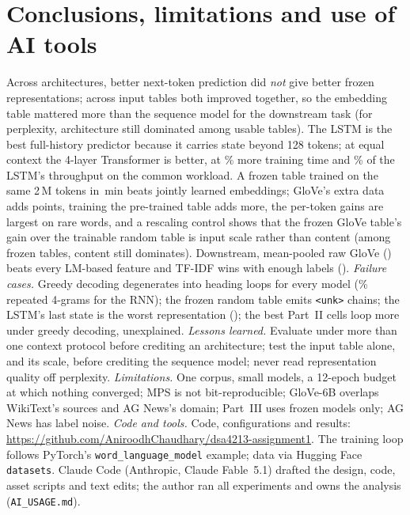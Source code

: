 \documentclass[10pt,a4paper]{article}
\begin{document}
\section{Conclusions, limitations and use of AI tools}
Across architectures, better next-token prediction did \emph{not} give better frozen representations; across input tables both improved together, so the embedding table mattered more than the sequence model for the downstream task (for perplexity, architecture still dominated among usable tables). The LSTM is the best
full-history predictor because it carries state beyond 128 tokens; at equal context the 4-layer Transformer is better, at \trainTimePct\% more training time and \blocksThroughputPct\% of the LSTM's throughput on the common workload. A frozen table trained on the same 2\,M tokens in \skipgramMinutes{}\,min beats jointly learned embeddings; GloVe's extra data adds \cSkipVsGloveFrozen{} points, training the pre-trained table adds \cGloveFrozenVsTrain{} more, the per-token gains are largest on rare words, and a rescaling control shows that the frozen GloVe table's gain over the trainable random table is input scale rather than content (among frozen tables, content still dominates). Downstream,
mean-pooled raw GloVe (\fOneEmbGloveMean) beats every LM-based feature and TF-IDF wins with enough
labels (\fOneTfidf).
\emph{Failure cases.} Greedy decoding degenerates into heading loops for every model (\repGreedyRNN\% repeated 4-grams for the RNN); the frozen random table emits \texttt{<unk>} chains; the LSTM's last state is the worst representation (\fOneLstmRandLast); the best Part~II cells loop more under greedy decoding, unexplained. \emph{Lessons learned.} Evaluate under more than one context protocol before crediting an architecture; test the input table alone, and its scale, before crediting the sequence model; never read representation quality off perplexity.
\emph{Limitations.} One corpus, small models, a 12-epoch budget at which nothing converged; MPS is not bit-reproducible; GloVe-6B overlaps WikiText's sources and AG News's domain; Part~III uses frozen models only; AG News has label noise. \emph{Code and tools.} Code, configurations and results: \url{https://github.com/AniroodhChaudhary/dsa4213-assignment1}. The training loop follows PyTorch's \texttt{word\_language\_model} example; data via Hugging Face \texttt{datasets}. Claude Code (Anthropic, Claude Fable~5.1) \citep{claudecode2026} drafted the design, code, asset scripts and text edits; the author ran all experiments and owns the analysis (\texttt{AI\_USAGE.md}).
\end{document}
